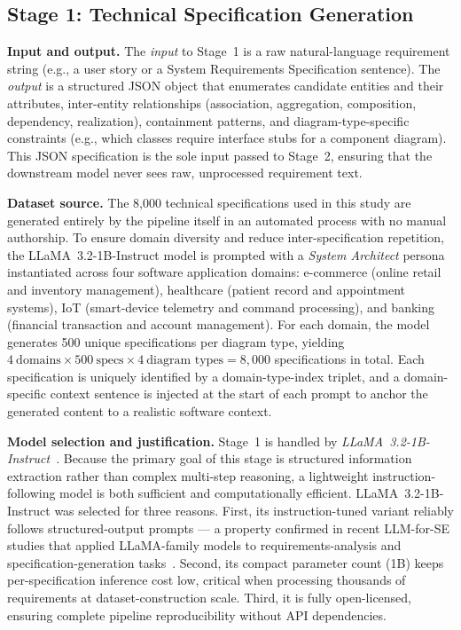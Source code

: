 \documentclass[conference]{IEEEtran}
\begin{document}
\subsection{Stage 1: Technical Specification Generation}

\textbf{Input and output.}
The \textit{input} to Stage~1 is a raw natural-language requirement
string (e.g., a user story or a System Requirements Specification
sentence). The \textit{output} is a structured JSON object that
enumerates candidate entities and their attributes, inter-entity
relationships (association, aggregation, composition, dependency,
realization), containment patterns, and diagram-type-specific
constraints (e.g., which classes require interface stubs for a
component diagram). This JSON specification is the sole input passed
to Stage~2, ensuring that the downstream model never sees raw,
unprocessed requirement text.

\textbf{Dataset source.}
The 8,000 technical specifications used in this study are generated
entirely by the pipeline itself in an automated process with no
manual authorship. To ensure domain diversity and reduce
inter-specification repetition, the LLaMA~3.2-1B-Instruct model is
prompted with a \textit{System Architect} persona instantiated across
four software application domains: e-commerce (online retail and
inventory management), healthcare (patient record and appointment
systems), IoT (smart-device telemetry and command processing), and
banking (financial transaction and account management). For each
domain, the model generates 500 unique specifications per diagram
type, yielding $4~\text{domains} \times 500~\text{specs} \times
4~\text{diagram types} = 8{,}000$ specifications in total. Each
specification is uniquely identified by a domain-type-index triplet,
and a domain-specific context sentence is injected at the start of
each prompt to anchor the generated content to a realistic software
context.

\textbf{Model selection and justification.}
Stage~1 is handled by \textit{LLaMA~3.2-1B-Instruct}~\cite{llama3herd}.
Because the primary goal of this stage is structured information
extraction rather than complex multi-step reasoning, a lightweight
instruction-following model is both sufficient and computationally
efficient. LLaMA~3.2-1B-Instruct was selected for three reasons.
First, its instruction-tuned variant reliably follows
structured-output prompts — a property confirmed in recent
LLM-for-SE studies that applied LLaMA-family models to
requirements-analysis and specification-generation
tasks~\cite{jahan2024, bates2025}. Second, its compact parameter
count (1B) keeps per-specification inference cost low, critical when
processing thousands of requirements at dataset-construction scale.
Third, it is fully open-licensed, ensuring complete pipeline
reproducibility without API dependencies.
\end{document}
